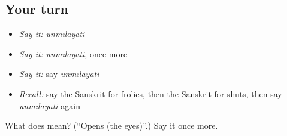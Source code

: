 \subsection*{Your turn}
\begin{itemize}
\raggedright
  \item \emph{Say it:} \emph{unmīlayati}
  \item \emph{Say it:} \emph{unmīlayati}, once more
  \item \emph{Say it:} say \emph{unmīlayati}
  \item \emph{Recall:} say the Sanskrit for frolics, then the Sanskrit for shuts, then say \emph{unmīlayati} again
\end{itemize}

\begin{tcolorbox}[breakable,colback=teal!4,colframe=teal!35!black,title={Before you move on}]
What does  mean? (\textquotedblleft{}Opens (the eyes)\textquotedblright{}.) Say it once more.
\end{tcolorbox}
